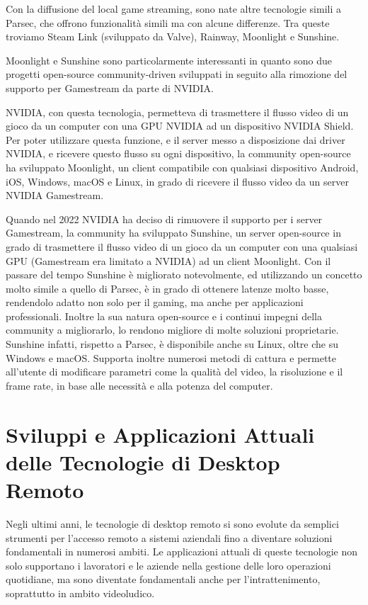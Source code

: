 \documentclass[12pt,a4paper,openright,twoside]{book}
\begin{document}
Con la diffusione del local game streaming, sono nate altre tecnologie simili a Parsec, che offrono funzionalità simili ma con alcune differenze. Tra queste troviamo Steam Link (sviluppato da Valve), Rainway, Moonlight e Sunshine.

Moonlight e Sunshine sono particolarmente interessanti in quanto sono due progetti open-source community-driven sviluppati in seguito alla rimozione del supporto per Gamestream da parte di NVIDIA.

NVIDIA, con questa tecnologia, permetteva di trasmettere il flusso video di un gioco da un computer con una GPU NVIDIA ad un dispositivo NVIDIA Shield. Per poter utilizzare questa funzione, e il server messo a disposizione dai driver NVIDIA, e ricevere questo flusso su ogni dispositivo, la community open-source ha sviluppato Moonlight, un client compatibile con qualsiasi dispositivo Android, iOS, Windows, macOS e Linux, in grado di ricevere il flusso video da un server NVIDIA Gamestream.

Quando nel 2022 NVIDIA ha deciso di rimuovere il supporto per i server Gamestream, la community ha sviluppato Sunshine, un server open-source in grado di trasmettere il flusso video di un gioco da un computer con una qualsiasi GPU (Gamestream era limitato a NVIDIA) ad un client Moonlight.
Con il passare del tempo Sunshine è migliorato notevolmente, ed utilizzando un concetto molto simile a quello di Parsec, è in grado di ottenere latenze molto basse, rendendolo adatto non solo per il gaming, ma anche per applicazioni professionali. Inoltre la sua natura open-source e i continui impegni della community a migliorarlo, lo rendono migliore di molte soluzioni proprietarie. Sunshine infatti, rispetto a Parsec, è disponibile anche su Linux, oltre che su Windows e macOS. Supporta inoltre numerosi metodi di cattura e permette all'utente di modificare parametri come la qualità del video, la risoluzione e il frame rate, in base alle necessità e alla potenza del computer.


\chapter{Sviluppi e Applicazioni Attuali delle Tecnologie di Desktop Remoto}
\label{chap:current-applications}

Negli ultimi anni, le tecnologie di desktop remoto si sono evolute da semplici strumenti per l’accesso remoto a sistemi aziendali fino a diventare soluzioni fondamentali in numerosi ambiti. Le applicazioni attuali di queste tecnologie non solo supportano i lavoratori e le aziende nella gestione delle loro operazioni quotidiane, ma sono diventate fondamentali anche per l’intrattenimento, soprattutto in ambito videoludico.
\end{document}
